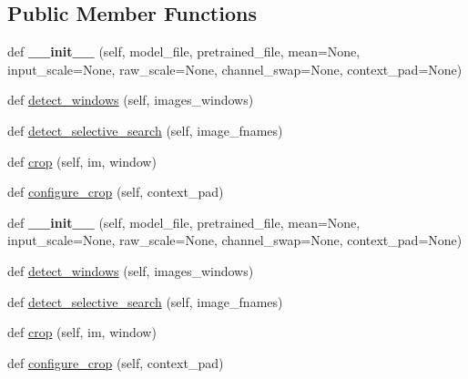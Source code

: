\subsection*{Public Member Functions}
\begin{DoxyCompactItemize}
\item 
\mbox{\label{classcaffe_1_1detector_1_1_detector_ad66493aa5af7401b00e9c3c840373d20}} 
def {\bfseries \+\_\+\+\_\+init\+\_\+\+\_\+} (self, model\+\_\+file, pretrained\+\_\+file, mean=None, input\+\_\+scale=None, raw\+\_\+scale=None, channel\+\_\+swap=None, context\+\_\+pad=None)
\item 
def \mbox{\hyperlink{classcaffe_1_1detector_1_1_detector_a7ddd403050bacd8fcccc62705f2405ff}{detect\+\_\+windows}} (self, images\+\_\+windows)
\item 
def \mbox{\hyperlink{classcaffe_1_1detector_1_1_detector_a2d96c53701abd37152c5f078a18ebf08}{detect\+\_\+selective\+\_\+search}} (self, image\+\_\+fnames)
\item 
def \mbox{\hyperlink{classcaffe_1_1detector_1_1_detector_af71bb7e173a228c2e1577b9125310216}{crop}} (self, im, window)
\item 
def \mbox{\hyperlink{classcaffe_1_1detector_1_1_detector_a3706bb8bcd04387c065f7bb6b34f4875}{configure\+\_\+crop}} (self, context\+\_\+pad)
\item 
\mbox{\label{classcaffe_1_1detector_1_1_detector_ad66493aa5af7401b00e9c3c840373d20}} 
def {\bfseries \+\_\+\+\_\+init\+\_\+\+\_\+} (self, model\+\_\+file, pretrained\+\_\+file, mean=None, input\+\_\+scale=None, raw\+\_\+scale=None, channel\+\_\+swap=None, context\+\_\+pad=None)
\item 
def \mbox{\hyperlink{classcaffe_1_1detector_1_1_detector_a7ddd403050bacd8fcccc62705f2405ff}{detect\+\_\+windows}} (self, images\+\_\+windows)
\item 
def \mbox{\hyperlink{classcaffe_1_1detector_1_1_detector_a2d96c53701abd37152c5f078a18ebf08}{detect\+\_\+selective\+\_\+search}} (self, image\+\_\+fnames)
\item 
def \mbox{\hyperlink{classcaffe_1_1detector_1_1_detector_af71bb7e173a228c2e1577b9125310216}{crop}} (self, im, window)
\item 
def \mbox{\hyperlink{classcaffe_1_1detector_1_1_detector_a3706bb8bcd04387c065f7bb6b34f4875}{configure\+\_\+crop}} (self, context\+\_\+pad)
\end{DoxyCompactItemize}
